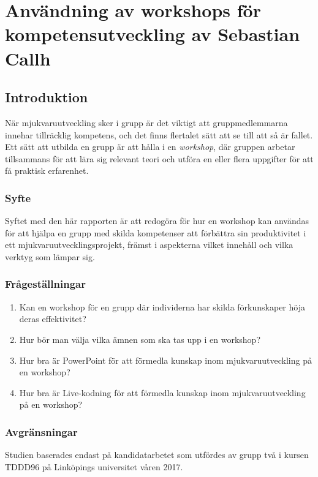 \chapter{Användning av workshops för kompetensutveckling
  av Sebastian Callh}

\section{Introduktion}
\label{cha:seba-introduction}
När mjukvaruutveckling sker i grupp är det viktigt att gruppmedlemmarna innehar tillräcklig kompetens,
och det finns flertalet sätt att se till att så är fallet. Ett sätt att utbilda en grupp
är att hålla i en \textit{workshop}, där gruppen arbetar tillsammans för att lära sig relevant
teori och utföra en eller flera uppgifter för att få praktisk erfarenhet.

\subsection{Syfte}
\label{sec:seba-aim}
Syftet med den här rapporten är att redogöra för hur en workshop kan användas
för att hjälpa en grupp med skilda kompetenser att förbättra sin produktivitet i ett
mjukvaruutvecklingsprojekt, främst i aspekterna vilket innehåll och vilka verktyg som lämpar sig.

\subsection{Frågeställningar}
\label{sec:seba-research-questions}

\begin{enumerate}
\item Kan en workshop för en grupp där individerna har skilda förkunskaper höja deras effektivitet?

\item Hur bör man välja vilka ämnen som ska tas upp i en workshop?

\item Hur bra är PowerPoint för att förmedla kunskap inom mjukvaruutveckling på en workshop?

\item Hur bra är Live-kodning för att förmedla kunskap inom mjukvaruutveckling på en workshop? 
\end{enumerate}

\subsection{Avgränsningar}
\label{sec:seba-delimitations}
Studien baserades endast på kandidatarbetet som utfördes av
grupp två i kursen TDDD96 på Linköpings universitet våren 2017.

